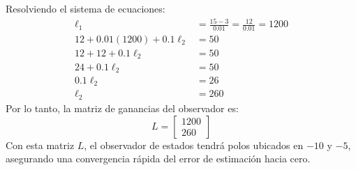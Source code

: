 \documentclass[
  11pt,
  letterpaper,
   addpoints,
   answers
  ]{exam}
\begin{document}
\begin{solution}
Resolviendo el sistema de ecuaciones:
\begin{align}
  \ell_1 &= \frac{15-3}{0.01} = \frac{12}{0.01} = 1200 \\
  12 + 0.01(1200) + 0.1\ell_2 &= 50 \\
  12 + 12 + 0.1\ell_2 &= 50 \\
  24 + 0.1\ell_2 &= 50 \\
  0.1\ell_2 &= 26 \\
  \ell_2 &= 260
\end{align}
Por lo tanto, la matriz de ganancias del observador es:
\[
L=\begin{bmatrix}1200\\260\end{bmatrix}
\]
Con esta matriz $L$, el observador de estados tendrá polos ubicados en $-10$ y $-5$, asegurando una convergencia rápida del error de estimación hacia cero.
\end{solution}
\end{document}
